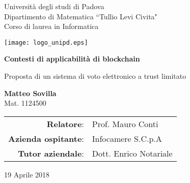 \begin{titlepage}
    \begin{center}
        \vspace*{1cm}

        \large

        Università degli studi di Padova\\
        Dipartimento di Matematica ``Tullio Levi Civita"\\
        Corso di laurea in Informatica

        \vspace*{1cm}

        \texttt{[image: logo\_unipd.eps]}

        \vspace{0.5cm}
        
        \Huge
        \textbf{Contesti di applicabilità di blockchain}
        
        \vspace{0.5cm}

        \large
        Proposta di un sistema di voto elettronico a trust limitato
        
        \vspace{1cm}
        
        \textbf{Matteo Sovilla} \\ Mat. 1124500
        
        \vspace{0.5cm}
        
        \begin{center}
        	\begin{tabular}{ r l }
        		\textbf{Relatore}: & Prof. Mauro Conti \\
        		\textbf{Azienda ospitante}: & Infocamere S.C.p.A \\
        		\textbf{Tutor aziendale}: & Dott. Enrico Notariale \\
        	\end{tabular}
        \end{center}
        
        \vspace{0.5cm}

        19 Aprile 2018
        
    \end{center}
\end{titlepage}
